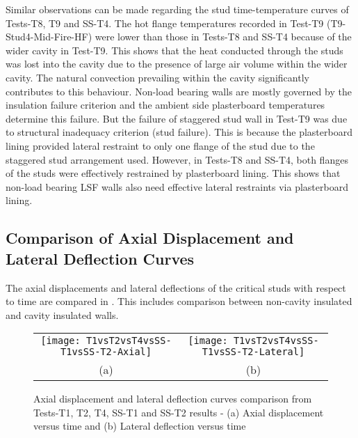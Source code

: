 Similar observations can be made regarding the stud time-temperature curves of Tests-T8, T9 and SS-T4. The hot flange temperatures recorded in Test-T9 (T9-Stud4-Mid-Fire-HF) were lower than those in Tests-T8 and SS-T4 because of the wider cavity in Test-T9. This shows that the heat conducted through the studs was lost into the cavity due to the presence of large air volume within the wider cavity. The natural convection prevailing within the cavity significantly contributes to this behaviour. Non-load bearing walls are mostly governed by the insulation failure criterion and the ambient side plasterboard temperatures determine this failure. But the failure of staggered stud wall in Test-T9 was due to structural inadequacy criterion (stud failure). This is because the plasterboard lining provided lateral restraint to only one flange of the stud due to the staggered stud arrangement used. However, in Tests-T8 and SS-T4, both flanges of the studs were effectively restrained by plasterboard lining. This shows that non-load bearing LSF walls also need effective lateral restraints via plasterboard lining.

\subsection[Comparison of Axial Displacement and Lateral Deflection Curves]{Comparison of Axial Displacement and \\Lateral Deflection Curves}

The axial displacements and lateral deflections of the critical studs with respect to time are compared in  . This includes comparison between non-cavity insulated and cavity insulated walls. 
\begin{figure}[!htbp]
	\centering
		\begin{tabular}{cc}
			\texttt{[image: T1vsT2vsT4vsSS-T1vsSS-T2-Axial]} & \texttt{[image: T1vsT2vsT4vsSS-T1vsSS-T2-Lateral]} \\ 
			(a) & (b)  \\ 
		\end{tabular} 
		\caption{Axial displacement and lateral deflection curves comparison from Tests-T1, T2, T4, SS-T1 and SS-T2 results - (a) Axial displacement versus time and (b) Lateral deflection versus time}
		\label{fig:T1vsT2vsT4vsSS-T1vsSS-T2-Displacement}
\end{figure}


